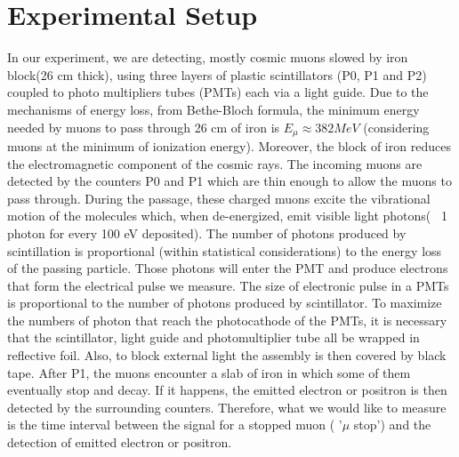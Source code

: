 \chapter{Experimental Setup}
\label{sec:setup}
	In our experiment, we are detecting, mostly cosmic muons slowed by iron block(26 cm thick), using three layers of plastic scintillators (P0, P1 and P2) coupled to photo multipliers tubes (PMTs) each via a light guide. Due to the mechanisms of energy loss, from Bethe-Bloch formula, the minimum energy needed by muons to pass through 26 cm of iron is $E_{\mu} \approx 382 MeV$ (considering muons at the minimum of ionization energy). Moreover, the block of iron reduces the electromagnetic component of the cosmic rays.
	The incoming muons are detected by the counters P0 and P1 which are thin enough to allow the muons to pass through. During the passage, these charged muons excite the vibrational motion of the molecules which, when de-energized, emit visible light photons( ~1 photon for every 100 eV deposited). The number of photons produced by scintillation is proportional (within statistical considerations) to the energy loss of the passing particle. Those photons will enter the PMT and produce electrons that form the electrical pulse we measure. The size of electronic pulse in a PMTs is proportional to the number of photons produced by scintillator. To maximize the numbers of photon that reach the photocathode of the PMTs, it is necessary that the scintillator, light guide and photomultiplier tube all be wrapped in reflective foil. Also, to block external light the assembly is then covered by black tape.
	After P1, the muons encounter a slab of iron in which some of them eventually stop and decay. If it happens, the emitted electron or positron is then detected by the surrounding counters. Therefore, what we would like to measure is the time interval between the signal for a stopped muon ( ’$\mu$ stop’) and the detection of emitted electron or positron.
